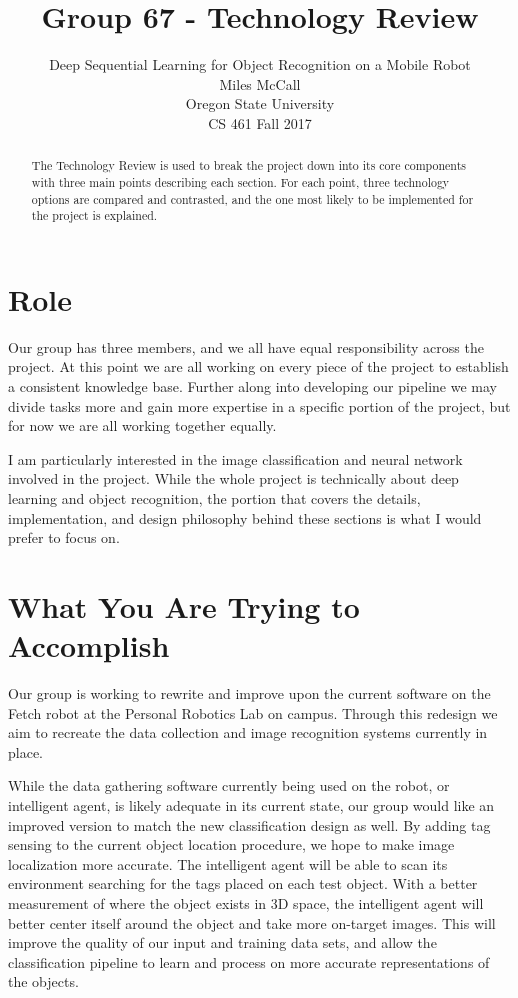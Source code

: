 \documentclass[draftclsnofoot, onecolumn, 10pt, compsoc]{IEEEtran}
\title{Group 67 - Technology Review}
\author{
	Deep Sequential Learning for Object Recognition on a Mobile Robot \\
	Miles McCall\\
	Oregon State University \\
	CS 461 Fall 2017
}
\begin{document}
	\maketitle
	
	\begin{abstract}
		\noindent The Technology Review is used to break the project down into its core components with three main points describing each section. For each point, three technology options are compared and contrasted, and the one most likely to be implemented for the project is explained. 
	\end{abstract}
	
	\tableofcontents
	\newpage
	
	\section{Role}
		Our group has three members, and we all have equal responsibility across the project. At this point we are all working on every piece of the project to establish a consistent knowledge base. Further along into developing our pipeline we may divide tasks more and gain more expertise in a specific portion of the project, but for now we are all working together equally. 
		
		I am particularly interested in the image classification and neural network involved in the project. While the whole project is technically about deep learning and object recognition, the portion that covers the details, implementation, and design philosophy behind these sections is what I would prefer to focus on. 
	
	\section{What You Are Trying to Accomplish}
		Our group is working to rewrite and improve upon the current software on the Fetch robot at the Personal Robotics Lab on campus. Through this redesign we aim to recreate the data collection and image recognition systems currently in place.
		
		While the data gathering software currently being used on the robot, or intelligent agent, is likely adequate in its current state, our group would like an improved version to match the new classification design as well. By adding tag sensing to the current object location procedure, we hope to make image localization more accurate. The intelligent agent will be able to scan its environment searching for the tags placed on each test object. With a better measurement of where the object exists in 3D space, the intelligent agent will better center itself around the object and take more on-target images. This will improve the quality of our input and training data sets, and allow the classification pipeline to learn and process on more accurate representations of the objects. 
		
\end{document}
